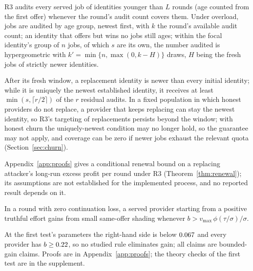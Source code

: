 \documentclass[11pt]{article}
\begin{document}
\begin{lemma}[coverage]\label{lem:coverage}
R3 audits every served job of identities younger than $L$ rounds (age counted from the first offer) whenever the round's audit count covers them. Under overload, jobs are audited by age group, newest first, with $k$ the round's available audit count; an identity that offers but wins no jobs still ages; within the focal identity's group of $n$ jobs, of which $s$ are its own, the number audited is hypergeometric with $k' = \min\{n, \max(0, k - H)\}$ draws, $H$ being the fresh jobs of strictly newer identities.
\end{lemma}

After its fresh window, a replacement identity is newer than every initial identity; while it is uniquely the newest established identity, it receives at least $\min(s, \lceil r/2 \rceil)$ of the $r$ residual audits. In a fixed population in which honest providers do not replace, a provider that keeps replacing can stay the newest identity, so R3's targeting of replacements persists beyond the window; with honest churn the uniquely-newest condition may no longer hold, so the guarantee may not apply, and coverage can be zero if newer jobs exhaust the relevant quota (Section~\ref{sec:churn}).



Appendix~\ref{app:proofs} gives a conditional renewal bound on a replacing attacker's long-run excess profit per round under R3 (Theorem~\ref{thm:renewal}); its assumptions are not established for the implemented process, and no reported result depends on it.

\begin{proposition}\label{prop:terminal}
In a round with zero continuation loss, a served provider starting from a positive truthful effort gains from small same-offer shading whenever $b > v_{\max}\,\phi(\tau/\sigma)/\sigma$.
\end{proposition}

At the first test's parameters the right-hand side is below $0.067$ and every provider has $b \ge 0.22$, so no studied rule eliminates gain; all claims are bounded-gain claims. Proofs are in Appendix~\ref{app:proofs}; the theory checks of the first test are in the supplement.
\end{document}
